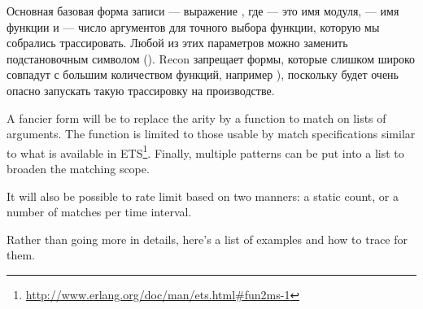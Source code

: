 Основная базовая форма записи --- выражение , где  --- это имя модуля,  --- имя функции и  --- число аргументов для точного выбора функции, которую мы собрались трассировать. Любой из этих параметров можно заменить подстановочным символом (). Recon запрещает формы, которые слишком широко совпадут с большим количеством функций, например ), поскольку будет очень опасно запускать такую трассировку на производстве.

A fancier form will be to replace the arity by a function to match on lists of arguments. The function is limited to those usable by match specifications similar to what is available in ETS\footnote{\href{http://www.erlang.org/doc/man/ets.html\#fun2ms-1}{http://www.erlang.org/doc/man/ets.html\#fun2ms-1}}. Finally, multiple patterns can be put into a list to broaden the matching scope.

It will also be possible to rate limit based on two manners: a static count, or a number of matches per time interval.

Rather than going more in details, here's a list of examples and how to trace for them.

